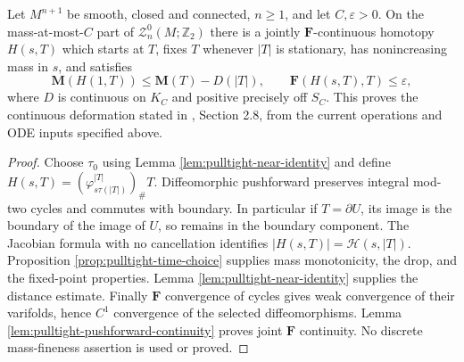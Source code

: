 \begin{theorem}\label{thm:continuous-pulltight-homotopy}
Let $M^{n+1}$ be smooth, closed and connected, $n\geq1$, and let $C,\varepsilon>0$. On the mass-at-most-$C$ part of $\mathcal Z_n^0(M;\mathbb Z_2)$ there is a jointly $\mathbf F$-continuous homotopy $H(s,T)$ which starts at $T$, fixes $T$ whenever $|T|$ is stationary, has nonincreasing mass in $s$, and satisfies
\[
 \mathbf M(H(1,T))\leq\mathbf M(T)-D(|T|),\qquad
 \mathbf F(H(s,T),T)\leq\varepsilon,
\]
where $D$ is continuous on $K_C$ and positive precisely off $S_C$. This proves the continuous deformation stated in \cite{MNIndex}, Section 2.8, from the current operations and ODE inputs specified above.
\end{theorem}
\begin{proof}
Choose $\tau_0$ using Lemma \ref{lem:pulltight-near-identity} and define $H(s,T)=(\varphi_{s\tau(|T|)}^{|T|})_\#T$. Diffeomorphic pushforward preserves integral mod-two cycles and commutes with boundary. In particular if $T=\partial U$, its image is the boundary of the image of $U$, so remains in the boundary component. The Jacobian formula with no cancellation identifies $|H(s,T)|=\mathscr H(s,|T|)$. Proposition \ref{prop:pulltight-time-choice} supplies mass monotonicity, the drop, and the fixed-point properties. Lemma \ref{lem:pulltight-near-identity} supplies the distance estimate. Finally $\mathbf F$ convergence of cycles gives weak convergence of their varifolds, hence $C^1$ convergence of the selected diffeomorphisms. Lemma \ref{lem:pulltight-pushforward-continuity} proves joint $\mathbf F$ continuity. No discrete mass-fineness assertion is used or proved.
\end{proof}
